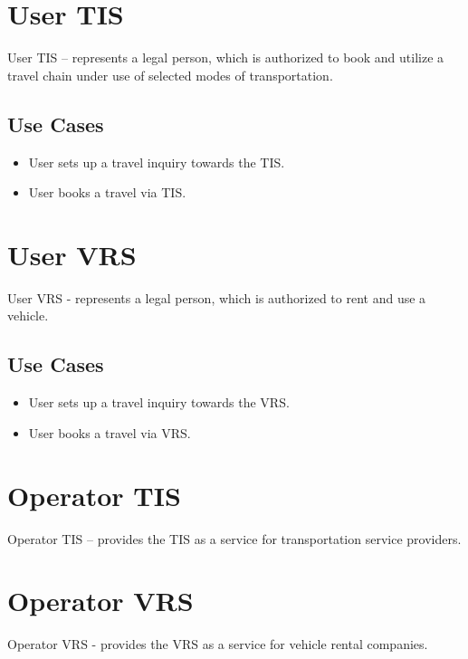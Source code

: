\section*{User TIS}
User TIS – represents a legal person, which is authorized to book and utilize a travel chain under use of selected modes of transportation.

\subsection*{Use Cases}
\begin{itemize}
\item User sets up a travel inquiry towards the TIS.
\item User books a travel via TIS.
\end{itemize}

\section*{User VRS}
User VRS - represents a legal person, which is authorized to rent and use a vehicle.

\subsection*{Use Cases}
\begin{itemize}
\item User sets up a travel inquiry towards the VRS.
\item User books a travel via VRS.
\end{itemize}

\section*{Operator TIS}
Operator TIS – provides the TIS as a service for transportation service providers.



\section*{Operator VRS}
Operator VRS - provides the VRS as a service for vehicle rental companies.

